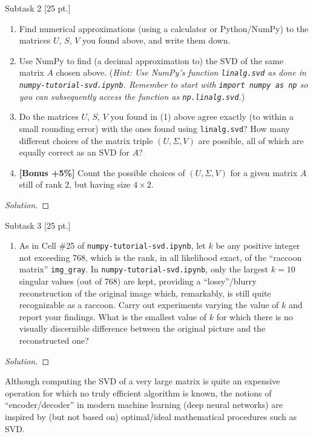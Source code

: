 \documentclass[12pt]{article}
\begin{document}
\begin{problem}{Subtask 2 [25 pt.]}
\begin{enumerate}
    \item Find numerical approximations (using a calculator or Python/NumPy) to the matrices $U$, $S$, $V$ you found above, and write them down.
    \item Use NumPy to find (a decimal approximation to) the SVD of the same matrix $A$ chosen above. (\textit{Hint: Use NumPy's function \texttt{linalg.svd} as done in \texttt{numpy-tutorial-svd.ipynb}. Remember to start with \lstinline{import numpy as np} so you can subsequently access the function as \texttt{np.linalg.svd}.})
    \item Do the matrices $U$, $S$, $V$ you found in (1) above agree exactly (to within a small rounding error) with the ones found using \texttt{linalg.svd}? How many different choices of the matrix triple $(U, \Sigma, V)$ are possible, all of which are equally correct as an SVD for $A$?
    \item \textbf{[Bonus +5\%]} Count the possible choices of $(U, \Sigma, V)$ for a given matrix $A$ still of rank 2, but having size $4 \times 2$.
\end{enumerate}
\end{problem}

\begin{proof}[Solution]
\end{proof}

\begin{problem}{Subtask 3 [25 pt.]}
\begin{enumerate}
    \item As in Cell \#25 of \texttt{numpy-tutorial-svd.ipynb}, let $k$ be any positive integer not exceeding 768, which is the rank, in all likelihood exact, of the ``raccoon matrix'' \texttt{img\_gray}. In \texttt{numpy-tutorial-svd.ipynb}, only the largest $k = 10$ singular values (out of 768) are kept, providing a ``lossy''/blurry reconstruction of the original image which, remarkably, is still quite recognizable as a raccoon. Carry out experiments varying the value of $k$ and report your findings. What is the smallest value of $k$ for which there is no visually discernible difference between the original picture and the reconstructed one?
\end{enumerate}
\end{problem}

\begin{proof}[Solution]
\end{proof}

\vspace{15pt}
Although computing the SVD of a very large matrix is quite an expensive operation for which no truly efficient algorithm is known, the notions of ``encoder/decoder'' in modern machine learning (deep neural networks) are inspired by (but not based on) optimal/ideal mathematical procedures such as SVD.
\end{document}
